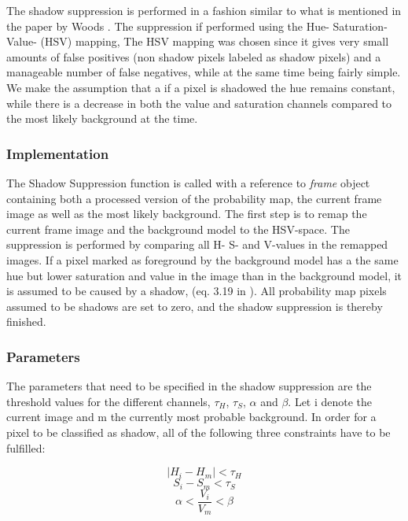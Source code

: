 The shadow suppression is performed in a fashion similar to what is mentioned in the paper by Woods \cite{Wood}. The suppression if performed using the Hue- Saturation- Value- (HSV) mapping, The HSV mapping was chosen since it gives very small amounts of false positives (non shadow pixels labeled as shadow pixels) and a manageable number of false negatives, while at the same time being fairly simple. We make the assumption that a if a pixel is shadowed the hue remains constant, while there is a decrease in both the value and saturation channels compared to the most likely background at the time.


\subsubsection{Implementation}
The Shadow Suppression function is called with a reference to \emph{frame} object containing both a processed version of the probability map, the current frame image as well as the most likely background. The first step is to remap the current frame image and the background model to the HSV-space. The suppression is performed by comparing all H- S- and V-values in the remapped images. If a pixel marked as foreground by the background model has a the same hue but lower saturation and value in the image than in the background model, it is assumed to be caused by a shadow, (eq. 3.19 in \cite{Wood}). All probability map pixels assumed to be shadows are set to zero, and the shadow suppression is thereby finished.

\subsubsection{Parameters}
The parameters that need to be specified in the shadow suppression are the threshold values for the different channels, $\tau_H$, $\tau_S$, $\alpha$ and $\beta$. Let i denote the current image and m the currently most probable background. In order for a pixel to be classified as shadow, all of the following three constraints have to be fulfilled:

\begin{equation}
	|H_i - H_m| < \tau_H
	\label{eq:H}
\end{equation}
\begin{equation}
	S_i - S_m < \tau_S
	\label{eq:S}
\end{equation}
\begin{equation}
	\alpha < \frac{V_i}{V_m} < \beta
	\label{eq:V}
\end{equation}

